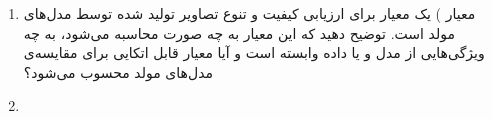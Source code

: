 \begin{enumerate}
	\begin{qsolve}
		
	\end{qsolve}
	
	
	
	
	
	
	\item 
معیار ) یک معیار برای ارزیابی کیفیت و تنوع تصاویر تولید شده توسط مدل‌های مولد است. توضیح دهید که این معیار به چه صورت محاسبه می‌شود، به چه ویژگی‌هایی از مدل و یا داده وابسته است و آیا معیار قابل اتکایی برای مقایسه‌ی مدل‌های مولد محسوب می‌شود؟
	
	\begin{qsolve}
		
	\end{qsolve}
	
	
	
	
	
	\item 
	
	
	
	
	
\end{enumerate}


























